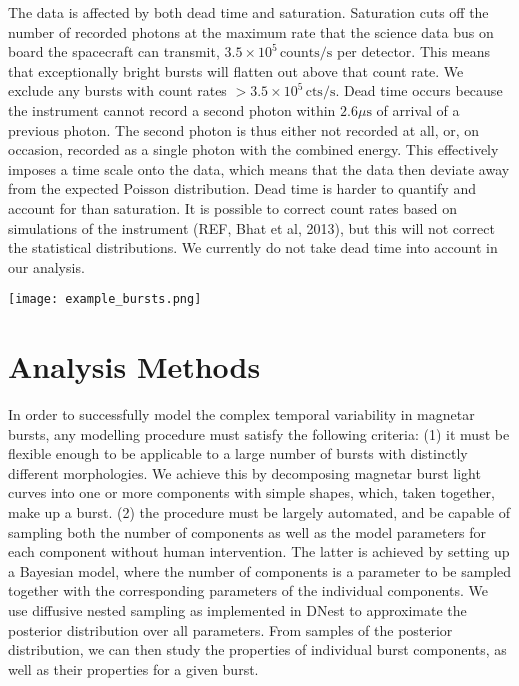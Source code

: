\documentclass[12pt]{emulateapj}
\newcommand{\project}[1]{\textsl{#1}}
\newcommand{\RXTE}{\project{RXTE}}
\newcommand{\counts}{y}
\begin{document}
The data is affected by both dead time and saturation. Saturation cuts off the number of recorded photons at the maximum rate
that the science data bus on board the spacecraft can transmit, $3.5 \times 10^{5} \, \mathrm{counts}/\mathrm{s}$ per detector. This means
that exceptionally bright bursts will flatten out above that count rate. We exclude any bursts with count rates $>3.5\times10^{5} \, \mathrm{cts}/\mathrm{s}$.
Dead time occurs because the instrument cannot record a second photon within $2.6\mu\mathrm{s}$ of arrival of a previous photon. 
The second photon is thus either not recorded at all, or, on occasion, recorded as a single photon with the combined energy. This effectively 
imposes a time scale onto the data, which means that the data then deviate away from the expected Poisson distribution. 
Dead time is harder to quantify and account for than saturation. It is possible to correct count rates based on simulations of the instrument (REF, Bhat et al, 2013),
but this will not correct the statistical distributions. We currently do not take dead time into account in our analysis. 




\begin{figure*}[h]
\begin{center}
\texttt{[image: example\_bursts.png]}
\caption{}
\label{fig:example_bursts}
\end{center}
\end{figure*}

\section{Analysis Methods}

In order to successfully model the complex temporal variability in magnetar bursts, any modelling procedure must satisfy the following criteria: (1) it must be flexible enough to be applicable to a large number of bursts with distinctly different morphologies. We achieve this by decomposing magnetar burst light curves into one or more components with simple shapes, which, taken together, make up a burst. (2) the procedure must be largely automated, and be capable of sampling both the number of components as well as the model parameters for each component without human intervention. The latter is achieved by setting up a Bayesian model, where the number of components is a parameter to be sampled together with the corresponding parameters of the individual components. We use diffusive nested sampling as implemented in DNest \citep{brewer2011} to approximate the posterior distribution over all parameters. From samples of the posterior distribution,
we can then study the properties of individual burst components, as well as their properties for a given burst.
\end{document}
